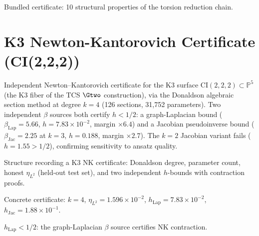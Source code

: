\begin{theorem}\label{thm:k3_cert}
    \leanok
    Bundled certificate: 10 structural properties of the torsion reduction chain.
\end{theorem}

\section{K3 Newton-Kantorovich Certificate (CI(2,2,2))}\label{sec:k3_nk}

Independent Newton--Kantorovich certificate for the K3 surface $\mathrm{CI}(2,2,2) \subset \mathbb{P}^5$
(the K3 fiber of the TCS $\Gtwo$ construction), via the Donaldson algebraic section method
at degree $k=4$ (126 sections, 31{,}752 parameters). Two independent $\beta$ sources both
certify $h < 1/2$: a graph-Laplacian bound ($\beta_{\mathrm{Lap}} = 5.66$, $h = 7.83 \times 10^{-2}$,
margin $\times 6.4$) and a Jacobian pseudoinverse bound ($\beta_{\mathrm{Jac}} = 2.25$ at $k=3$,
$h = 0.188$, margin $\times 2.7$). The $k=2$ Jacobian variant fails ($h = 1.55 > 1/2$),
confirming sensitivity to ansatz quality.

\begin{definition}\label{def:k3nk_cert}
    \leanok
    Structure recording a K3 NK certificate: Donaldson degree, parameter count,
    honest $\eta_{L^2}$ (held-out test set), and two independent $h$-bounds with
    contraction proofs.
\end{definition}

\begin{definition}\label{def:ci222_cert}
    \leanok
    Concrete certificate: $k=4$, $\eta_{L^2} = 1.596 \times 10^{-2}$,
    $h_{\mathrm{Lap}} = 7.83 \times 10^{-2}$, $h_{\mathrm{Jac}} = 1.88 \times 10^{-1}$.
\end{definition}

\begin{theorem}\label{thm:k3_lap}
    \leanok
    $h_{\mathrm{Lap}} < 1/2$: the graph-Laplacian $\beta$ source certifies NK contraction.
\end{theorem}

